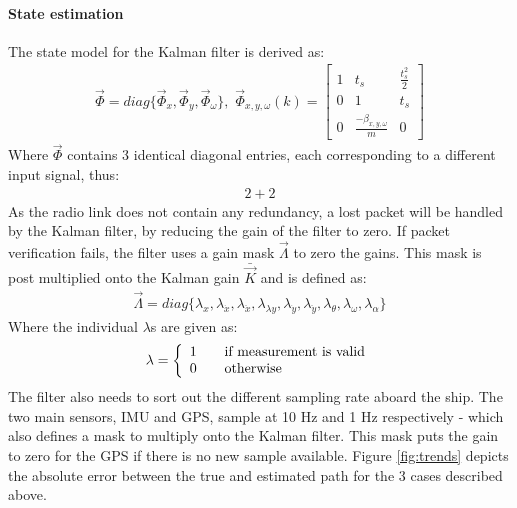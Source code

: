 \documentclass[a0,portrait]{a0poster}
\begin{document}
\begin{center}
{\paragraph{State estimation}
The state model for the Kalman filter is derived as:
\begin{align}
\vec{\Phi} = diag\{\vec{\Phi}_x,\vec{\Phi}_y,\vec{\Phi}_\omega\},\,\,
\vec{\Phi}_{x,y,\omega}(k) = \begin{bmatrix}
1 & t_s & \frac{t_s^2}{2}\\
0 & 1 & t_s\\
0 & \frac{-\beta_{x,y,\omega}}{m} & 0
\end{bmatrix}
\end{align}
Where $\vec{\Phi}$ contains 3 identical diagonal entries, each corresponding to a different input signal, thus:
\begin{align}
2+2
\end{align}
As the radio link does not contain any redundancy, a lost packet will be handled by the Kalman filter, by reducing the gain of the filter to zero. If packet verification fails, the filter uses a gain mask $\vec{\Lambda}$ to zero the gains. This mask is post multiplied onto the Kalman gain $\bar{\vec{K}}$ and is defined as:
\begin{align}
\vec{\Lambda} = diag\{\lambda_x,\lambda_{\dot{x}},\lambda_{\ddot{x}},\lambda_{\lambda{y}},\lambda_{\dot{y}},\lambda_{\ddot{y}},\lambda_{\theta},\lambda_{\omega},\lambda_{\alpha} \}
\end{align}
Where the individual $\lambda$s are given as:
\begin{align}
\lambda = 
\left\{ 
  \begin{array}{l l}
    1 & \quad \text{if measurement is valid}\\
    0 & \quad \text{otherwise}
  \end{array} \right.
\end{align} 
The filter also needs to sort out the different sampling rate aboard the ship. The two main sensors, IMU and GPS, sample at 10 Hz and 1 Hz respectively - which also defines a mask to multiply onto the Kalman filter. This mask puts the gain to zero for the GPS if there is no new sample available. Figure \vref{fig:trends} depicts the absolute error between the true and estimated path for the 3 cases described above. 


}
\col{
}
\end{center}
\end{document}
